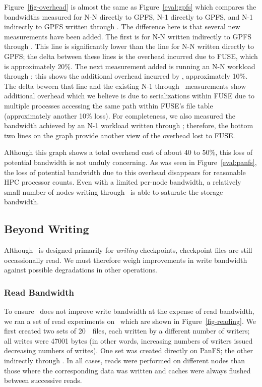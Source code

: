 Figure~\ref{fig-overhead} is almost the same as Figure~\ref{eval:gpfs} which
compares the bandwidths measured for N-N directly to GPFS, N-1 directly to
GPFS, and N-1 indirectly to GPFS written through \plfs. The difference here is
that several new measurements have been added. The first is for N-N written
indirectly to GPFS through \noopfs. This line is significantly lower than the
line for N-N written directly to GPFS; the delta between these lines is the
overhead incurred due to FUSE, which is approximately 20\%. The next
measurement added is running an N-N workload through \plfs; this shows the
additional overhead incurred by \plfs, approximately 10\%. 
The delta beween that line and the existing N-1 through \plfs\
measurements show additional overhead which we believe is due to serializations
within FUSE due to multiple processes accessing the same path within FUSE's
file table (approximately another 10\% loss). For completeness, we also
measured the bandwidth achieved by an N-1 workload written through \noopfs;
therefore, the bottom two lines on the graph provide another view of the
overhead lost to FUSE.

Although this graph shows a total overhead cost of about 40 to 50\%, this loss
of potential bandwidth is not unduly concerning. As was seen in
Figure~\ref{eval:panfs}, the loss of potential bandwidth due to this overhead
disappears for reasonable HPC processor counts. Even with a limited per-node
bandwidth, a relatively small number of nodes writing through \plfs\ is able to
saturate the storage bandwidth. 


\subsection{Beyond Writing}
Although \plfs\ is designed primarily for {\em writing} checkpoints,
checkpoint files are still occassionally read.
We must therefore weigh improvements in 
write bandwidth against possible degradations in other operations. 

\subsubsection{Read Bandwidth}


To ensure \plfs\ does not improve write bandwidth at the expense of read
bandwidth, we ran a set of read experiments on \rrz\ which are shown in
Figure~\ref{fig-reading}. We first created two sets of 20~\GB\ files, each
written by a different number of writers; all writes were 47001 bytes (in other
words, increasing numbers of writers issued decreasing numbers of writes). One
set was created directly on PanFS; the other indirectly through \plfs. In all
cases, reads were performed on different nodes than those where the
corresponding data was written and caches were always flushed between
successive reads.

